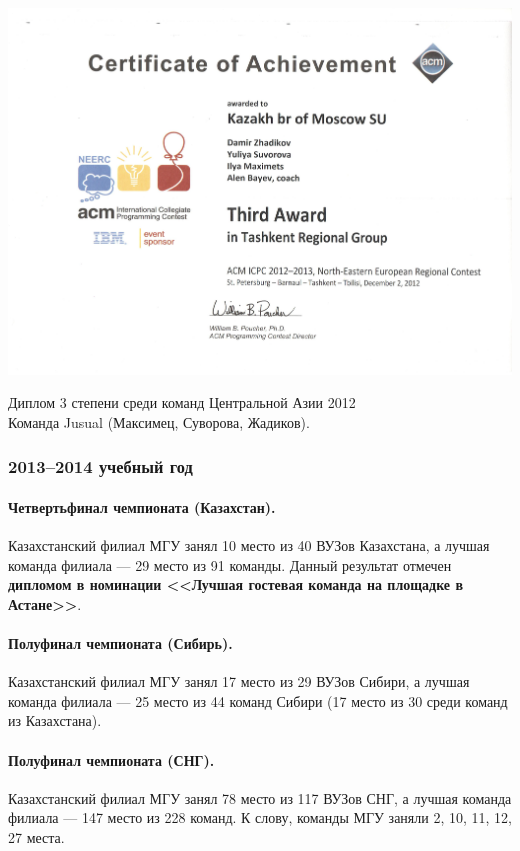 \begin{center}
\includegraphics[width=0.7\linewidth]{diploma/2012-tashkent}

Диплом 3 степени среди команд Центральной Азии 2012\\
Команда Jusual (Максимец, Суворова, Жадиков).
\end{center}
\newpage

\subsubsection*{2013--2014 учебный год}

\paragraph{Четвертьфинал чемпионата (Казахстан).} Казахстанский филиал МГУ занял 10 место из 40 ВУЗов Казахстана, а лучшая команда филиала --- 29 место из 91 команды. Данный результат отмечен \textbf{дипломом в номинации <<Лучшая гостевая команда на площадке в Астане>>}.

\paragraph{Полуфинал чемпионата (Сибирь).} Казахстанский филиал МГУ занял 17 место из 29 ВУЗов Сибири, а лучшая команда филиала --- 25 место из 44 команд Сибири (17 место из 30 среди команд из Казахстана).

\paragraph{Полуфинал чемпионата (СНГ).} Казахстанский филиал МГУ занял 78 место из 117 ВУЗов СНГ, а лучшая команда филиала --- 147 место из 228 команд. К слову, команды МГУ заняли 2, 10, 11, 12, 27 места.

